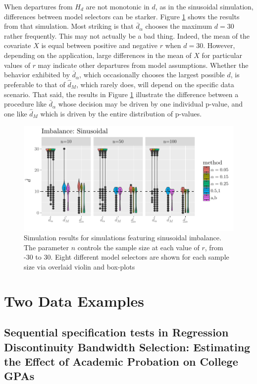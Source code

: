 \documentclass[lineno]{biometrika}\usepackage[]{graphicx}\usepackage[]{color}
\makeatletter
\def\maxwidth{ %
  \ifdim\Gin@nat@width>\linewidth
    \linewidth
  \else
    \Gin@nat@width
  \fi
}
\newcommand{\dalphaU}{\bar{d}_\alpha}
\newcommand{\dhatm}{\hat{d}_M}
\makeatother
\begin{document}
When departures from $H_d$ are not monotonic in $d$, as in the
sinusoidal simulation, differences between model selectors can be
starker.
Figure \ref{fig:sinImb} shows the results from that simulation.
Most striking is that $\dalphaU$ chooses the maximum $d=30$ rather
frequently.
This may not actually be a bad thing. Indeed, the mean of the
covariate $X$ is equal between positive and negative $r$ when $d=30$.
However, depending on the application, large differences in the mean
of $X$ for particular values of $r$ may indicate other departures from
model assumptions.
Whether the behavior exhibited by $\dalphaU$, which occasionally
chooses the largest possible $d$, is preferable to that of $\dhatm$,
which rarely does, will depend on the specific data scenario.
That said, the results in Figure \ref{fig:sinImb} illustrate the
difference between a procedure like $\dalphaU$ whose decision may be driven by one
individual p-value, and one like $\dhatm$ which is driven by the
entire distribution of p-values.


\begin{figure}

\includegraphics[width=\maxwidth]{figure/sinusoidalImbalance-1}

\caption{Simulation results for simulations featuring sinusoidal
  imbalance. The parameter $n$ controls the sample size at each value
  of $r$, from -30 to 30. Eight different model selectors are shown
  for each sample size via overlaid violin and box-plots}
\label{fig:sinImb}
\end{figure}




\section{Two Data Examples}\label{sec:examples}


\subsection{Sequential specification tests in Regression Discontinuity Bandwidth Selection:
  Estimating the Effect of  Academic Probation on College GPAs}
\end{document}
